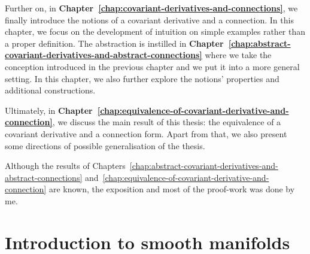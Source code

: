 \documentclass[11pt,a4paper,twoside,openany]{report}
\theoremstyle{my-theorem}
\theoremstyle{non-theorem}
\begin{document}
	Further on, in \textbf{Chapter~\ref{chap:covariant-derivatives-and-connections}}, we finally introduce the notions of a covariant derivative and a connection. In this chapter, we focus on the development of intuition on simple examples rather than a proper definition. The abstraction is instilled in \textbf{Chapter~\ref{chap:abstract-covariant-derivatives-and-abstract-connections}} where we take the conception introduced in the previous chapter and we put it into a more general setting. In this chapter, we also further explore the notions' properties and additional constructions.
	
	Ultimately, in \textbf{Chapter~\ref{chap:equivalence-of-covariant-derivative-and-connection}}, we discuss the main result of this thesis: the equivalence of a covariant derivative and a connection form. Apart from that, we also present some directions of possible generalisation of the thesis.
	
	Although the results of Chapters~\ref{chap:abstract-covariant-derivatives-and-abstract-connections} and~\ref{chap:equivalence-of-covariant-derivative-and-connection} are known, the exposition and most of the proof-work was done by me.
	
%		
		
	
	
	\chapter{Introduction to smooth manifolds}
	\label{chap:introduction-to-smooth-manifolds}
	
\end{document}
